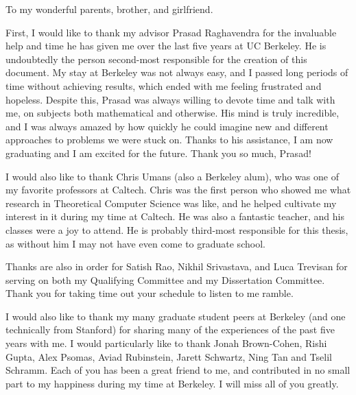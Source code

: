 \documentclass{ucbthesis}
\begin{document}
\begin{frontmatter}

\begin{dedication}
\null\vfil
\begin{center}
To my wonderful parents, brother, and girlfriend. 
\end{center}
\vfil\null
\end{dedication}

\tableofcontents
\clearpage

\begin{acknowledgements}
First, I would like to thank my advisor Prasad Raghavendra for the invaluable help and time he has given me over the last five years at UC Berkeley.
He is undoubtedly the person second-most responsible for the creation of this document. 
My stay at Berkeley was not always easy, and I passed long periods of time without achieving results, which ended with me feeling frustrated and hopeless.
Despite this, Prasad was always willing to devote time and talk with me, on subjects both mathematical and otherwise. 
His mind is truly incredible, and I was always amazed by how quickly he could imagine new and different approaches to problems we were stuck on. 
Thanks to his assistance, I am now graduating and I am excited for the future. 
Thank you so much, Prasad!

I would also like to thank Chris Umans (also a Berkeley alum), who was one of my favorite professors at Caltech. 
Chris was the first person who showed me what research in Theoretical Computer Science was like, and he helped cultivate my interest in it during my time at Caltech.
He was also a fantastic teacher, and his classes were a joy to attend.
He is probably third-most responsible for this thesis, as without him I may not have even come to graduate school. 

Thanks are also in order for Satish Rao, Nikhil Srivastava, and Luca Trevisan for serving on both my Qualifying Committee and my Dissertation Committee.
Thank you for taking time out your schedule to listen to me ramble. 

I would also like to thank my many graduate student peers at Berkeley (and one technically from Stanford) for sharing many of the experiences of the past five years with me. 
I would particularly like to thank Jonah Brown-Cohen, Rishi Gupta, Alex Psomas, Aviad Rubinstein, Jarett Schwartz, Ning Tan and Tselil Schramm. 
Each of you has been a great friend to me, and contributed in no small part to my happiness during my time at Berkeley. 
I will miss all of you greatly. 


\end{acknowledgements}
\end{frontmatter}
\end{document}
